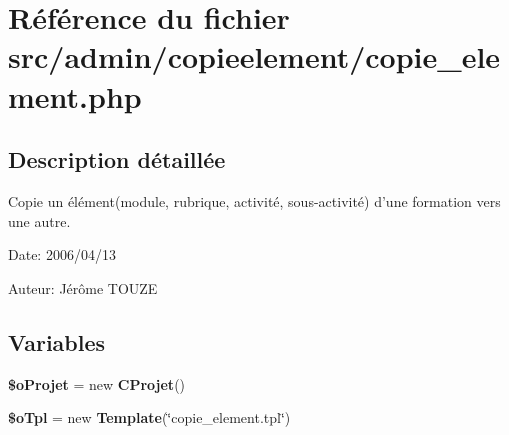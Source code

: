 \section{Référence du fichier src/admin/copieelement/copie\_\-element.php}
\label{copie__element_8php}


\subsection{Description détaillée}
Copie un élément(module, rubrique, activité, sous-activité) d'une formation vers une autre. 

\begin{Desc}
\item[Date:]2006/04/13\end{Desc}
\begin{Desc}
\item[Auteur:]Jérôme TOUZE \end{Desc}


\subsection*{Variables}
\begin{CompactItemize}
\item 
\textbf{\$oProjet} = new {\bf CProjet}()\label{copie__element_8php_ec412e7ac901485e72b77d2185159421}

\item 
\textbf{\$oTpl} = new {\bf Template}(\char`\"{}copie\_\-element.tpl\char`\"{})\label{copie__element_8php_7de57ba665b7c068e98ea46469be2865}

\end{CompactItemize}
